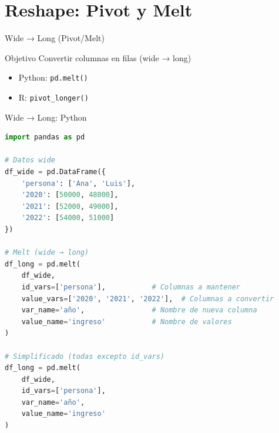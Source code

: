 \documentclass[aspectratio=169]{beamer}
\begin{document}
\section{Reshape: Pivot y Melt}

\begin{frame}{Wide → Long (Pivot/Melt)}
\begin{block}{Objetivo}
Convertir columnas en filas (wide → long)
\end{block}

\begin{center}
\end{center}

\vspace{0.5em}

\begin{itemize}
    \item Python: \texttt{pd.melt()}
    \item R: \texttt{pivot\_longer()}
\end{itemize}
\end{frame}

\begin{frame}[fragile]{Wide → Long: Python}
\begin{lstlisting}[language=Python]
import pandas as pd

# Datos wide
df_wide = pd.DataFrame({
    'persona': ['Ana', 'Luis'],
    '2020': [50000, 48000],
    '2021': [52000, 49000],
    '2022': [54000, 51000]
})

# Melt (wide → long)
df_long = pd.melt(
    df_wide,
    id_vars=['persona'],           # Columnas a mantener
    value_vars=['2020', '2021', '2022'],  # Columnas a convertir
    var_name='año',                # Nombre de nueva columna
    value_name='ingreso'           # Nombre de valores
)

# Simplificado (todas excepto id_vars)
df_long = pd.melt(
    df_wide, 
    id_vars=['persona'], 
    var_name='año', 
    value_name='ingreso'
)
\end{lstlisting}
\end{frame}
\end{document}
